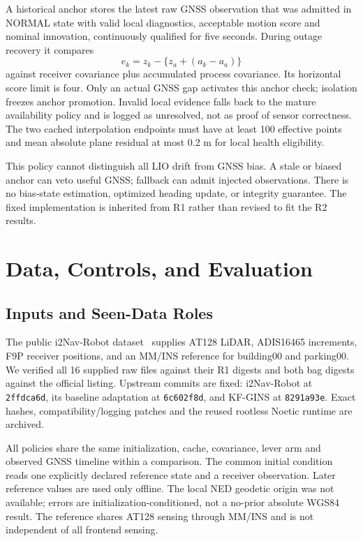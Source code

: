 \documentclass[conference]{IEEEtran}
\begin{document}
A historical anchor stores the latest raw GNSS observation that was admitted in NORMAL state with valid local diagnostics, acceptable motion score and nominal innovation, continuously qualified for five seconds. During outage recovery it compares
\begin{equation}
 e_k=z_k-\{z_a+(a_k-a_a)\}
\end{equation}
against receiver covariance plus accumulated process covariance. Its horizontal score limit is four. Only an actual GNSS gap activates this anchor check; isolation freezes anchor promotion. Invalid local evidence falls back to the mature availability policy and is logged as unresolved, not as proof of sensor correctness. The two cached interpolation endpoints must have at least 100 effective points and mean absolute plane residual at most 0.2 m for local health eligibility.

This policy cannot distinguish all LIO drift from GNSS bias. A stale or biased anchor can veto useful GNSS; fallback can admit injected observations. There is no bias-state estimation, optimized heading update, or integrity guarantee. The fixed implementation is inherited from R1 rather than revised to fit the R2 results.

\section{Data, Controls, and Evaluation}
\subsection{Inputs and Seen-Data Roles}
The public i2Nav-Robot dataset~\cite{i2nav} supplies AT128 LiDAR, ADIS16465 increments, F9P receiver positions, and an MM/INS reference for building00 and parking00. We verified all 16 supplied raw files against their R1 digests and both bag digests against the official listing. Upstream commits are fixed: i2Nav-Robot at \texttt{2ffdca6d}, its baseline adaptation at \texttt{6c602f8d}, and KF-GINS at \texttt{8291a93e}. Exact hashes, compatibility/logging patches and the reused rootless Noetic runtime are archived.

All policies share the same initialization, cache, covariance, lever arm and observed GNSS timeline within a comparison. The common initial condition reads one explicitly declared reference state and a receiver observation. Later reference values are used only offline. The local NED geodetic origin was not available; errors are initialization-conditioned, not a no-prior absolute WGS84 result. The reference shares AT128 sensing through MM/INS and is not independent of all frontend sensing.
\end{document}
